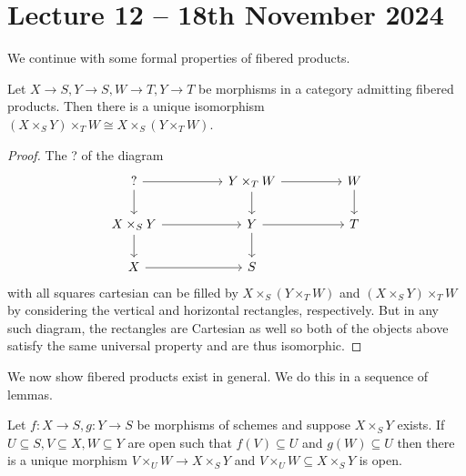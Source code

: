 \section{Lecture 12 -- 18th November 2024}\label{sec: lecture 12}
We continue with some formal properties of fibered products. 
\begin{proposition}\label{prop: triple fibered products are associative}
    Let $X\to S, Y\to S, W\to T, Y\to T$ be morphisms in a category admitting fibered products. Then there is a unique isomorphism $(X\times_{S}Y)\times_{T}W\cong X\times_{S}(Y\times_{T}W)$. 
\end{proposition}
\begin{proof}
    The ? of the diagram 
    $$%
    \begin{tikzcd}
        {?} && {Y\times_{T}W} && W \\
        {X\times_{S}Y} && Y && T \\
        X && S
        \arrow[from=1-1, to=1-3]
        \arrow[from=1-1, to=2-1]
        \arrow[from=1-3, to=1-5]
        \arrow[from=1-3, to=2-3]
        \arrow[from=1-5, to=2-5]
        \arrow[from=2-1, to=2-3]
        \arrow[from=2-1, to=3-1]
        \arrow[from=2-3, to=2-5]
        \arrow[from=2-3, to=3-3]
        \arrow[from=3-1, to=3-3]
    \end{tikzcd}$$
    with all squares cartesian can be filled by $X\times_{S}(Y\times_{T}W)$ and $(X\times_{S}Y)\times_{T}W$ by considering the vertical and horizontal rectangles, respectively. But in any such diagram, the rectangles are Cartesian as well so both of the objects above satisfy the same universal property and are thus isomorphic. 
\end{proof}
We now show fibered products exist in general. We do this in a sequence of lemmas.
\begin{lemma}
    Let $f:X\to S,g:Y\to S$ be morphisms of schemes and suppose $X\times_{S}Y$ exists. If $U\subseteq S, V\subseteq X, W\subseteq Y$ are open such that $f(V)\subseteq U$ and $g(W)\subseteq U$ then there is a unique morphism $V\times_{U}W\to X\times_{S}Y$ and $V\times_{U}W\subseteq X\times_{S}Y$ is open. 
\end{lemma}
